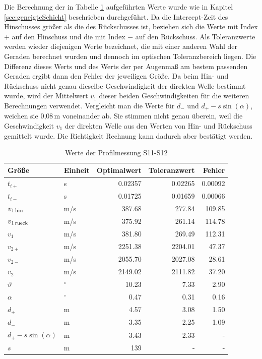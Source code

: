 Die Berechnung der in Tabelle \ref{tab:werte} aufgeführten Werte wurde wie in Kapitel \ref{sec:geneigteSchicht} beschrieben durchgeführt. Da die Intercept-Zeit des Hinschusses größer als die des Rückschusses ist, beziehen sich die Werte mit Index $+$ auf den Hinschuss und die mit Index $-$ auf den Rückschuss. Als Toleranzwerte werden wieder diejenigen Werte bezeichnet, die mit einer anderen Wahl der Geraden berechnet wurden und dennoch im optischen Toleranzbereich liegen. Die Differenz dieses Werts und des Werts der per Augenmaß am bestem passenden Geraden ergibt dann den Fehler der jeweiligen Größe. Da beim Hin- und Rückschuss nicht genau dieselbe Geschwindigkeit der direkten Welle bestimmt wurde, wird der Mittelwert $v_1$ dieser beiden Geschwindigkeiten für die weiteren Berechnungen verwendet. Vergleicht man die Werte für $d_-$ und $d_+-s\sin(\alpha)$, weichen sie 0,08\,m voneinander ab. Sie stimmen nicht genau überein, weil die Geschwindigkeit $v_1$ der direkten Welle aus den Werten von Hin- und Rückschuss gemittelt wurde. Die Richtigkeit Rechnung kann dadurch aber bestätigt werden.

\begin{table}[!ht]
\centering
\caption{Werte der Profilmessung S11-S12}
\label{tab:werte}
\begin{tabular}{llrrr}
\toprule
Größe & Einheit & Optimalwert   & Toleranzwert   & Fehler \\
\midrule
$t_{i+}$ & s & 0.02357  &0.02265 & 0.00092\\
$t_{i-}$ &s & 0.01725  &0.01659 & 0.00066\\
$v_{\mathrm{1\,hin}}$ & m/s &387.68 & 277.84&109.85\\
$v_{\mathrm{1\,rueck}}$ & m/s & 375.92& 261.14&114.78\\
$v_1$ & m/s & 381.80 & 269.49& 112.31\\
$v_{2+}$ & m/s & 2251.38  &2204.01 & 47.37\\
$v_{2-}$ & m/s & 2055.70 &2027.08 & 28.61\\
$v_2$ & m/s & 2149.02 &2111.82 & 37.20\\
$\vartheta$ & $^\circ$ & 10.23 & 7.33& 2.90\\
$\alpha$ & $^\circ$ & 0.47 & 0.31& 0.16\\
$d_+$ & m & 4.57 & 3.08& 1.50\\
$d_-$ & m & 3.35 &2.25 & 1.09\\
$d_+-s\sin(\alpha)$ & m & 3.43 & 2.33& -\\
$s$&m&139&-&-\\
\bottomrule
\end{tabular}
\end{table}